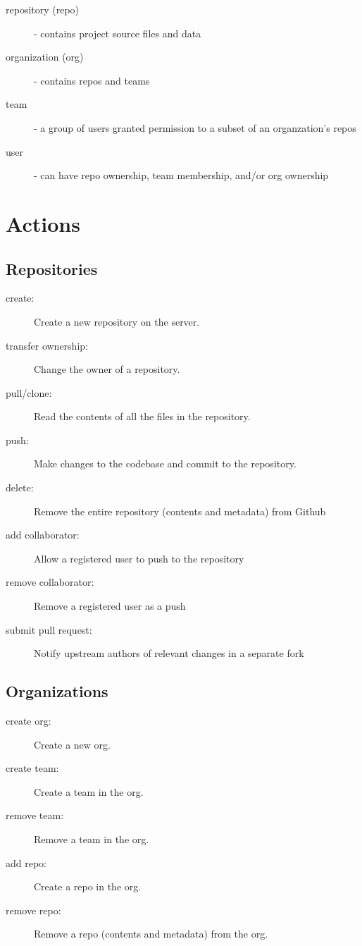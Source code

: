 \documentclass[11pt]{article}
\begin{document}

\begin{description}
\item[repository (repo)] - contains project source files and data
\item[organization (org)] - contains repos and teams
\item[team] - a group of users granted permission to a subset of an organzation's repos
\item[user] - can have repo ownership, team membership, and/or org ownership
\end{description}

\section*{Actions}


\subsection*{Repositories}
\begin{description}
\item[create:] 
Create a new repository on the server.
\item[transfer ownership:] 
Change the owner of a repository.
\item[pull/clone:]
Read the contents of all the files in the repository.
\item[push:]
Make changes to the codebase and commit to the repository.
\item[delete:]
Remove the entire repository (contents and metadata) from Github
\item[add collaborator:]
Allow a registered user to push to the repository
\item[remove collaborator:]
Remove a registered user as a push
\item[submit pull request:]
Notify upstream authors of relevant changes in a separate fork
\end{description}

\subsection*{Organizations}
\begin{description}
\item[create org:]
Create a new org.
\item[create team:]
Create a team in the org.
\item[remove team:]
Remove a team in the org.
\item[add repo:]
Create a repo in the org.
\item[remove repo:]
Remove a repo (contents and metadata) from the org.
\end{description}
\end{document}
